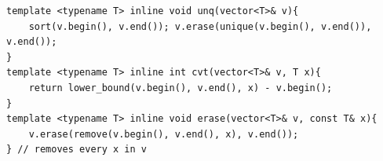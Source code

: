 \begin{verbatim}
template <typename T> inline void unq(vector<T>& v){
	sort(v.begin(), v.end()); v.erase(unique(v.begin(), v.end()), v.end());
}
template <typename T> inline int cvt(vector<T>& v, T x){
	return lower_bound(v.begin(), v.end(), x) - v.begin();
}
template <typename T> inline void erase(vector<T>& v, const T& x){
	v.erase(remove(v.begin(), v.end(), x), v.end());
} // removes every x in v
\end{verbatim}